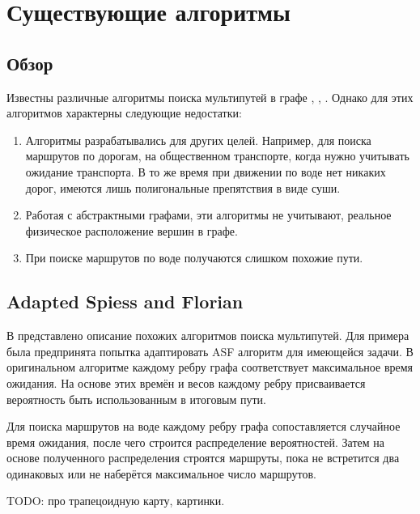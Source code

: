\chapter{Существующие алгоритмы}

\FloatBarrier

\section{Обзор}

Известны различные алгоритмы поиска мультипутей в графе
\cite{Hyperstar}, \cite{Hyunmyung}, \cite{Dial}. Однако для этих алгоритмов характерны следующие
недостатки: 
\begin{enumerate}
    \item Алгоритмы разрабатывались для других целей. Например, для поиска
      маршрутов по дорогам, на общественном транспорте, когда нужно
      учитывать ожидание транспорта. В то же время при движении по
      воде нет никаких дорог, имеются лишь полигональные препятствия в
      виде суши.
    \item Работая с абстрактными графами, эти алгоритмы не учитывают,
      реальное физическое расположение вершин в графе.
    \item При поиске маршрутов по воде получаются слишком похожие пути.
\end{enumerate}

\FloatBarrier

\section{Adapted Spiess and Florian}

В \cite{Hyperstar} представлено описание похожих алгоритмов поиска
мультипутей. Для примера была предпринята попытка адаптировать ASF
алгоритм для имеющейся задачи. В оригинальном алгоритме каждому ребру
графа соответствует максимальное время ожидания. На основе этих времён
и весов каждому ребру присваивается вероятность быть использованным в
итоговым пути.

Для поиска маршрутов на воде каждому ребру графа сопоставляется
случайное время ожидания, после чего строится распределение
вероятностей. Затем на основе полученного распределения строятся
маршруты, пока не встретится два одинаковых или не наберётся
максимальное число маршрутов.

TODO: про трапецоидную карту, картинки.

\FloatBarrier

